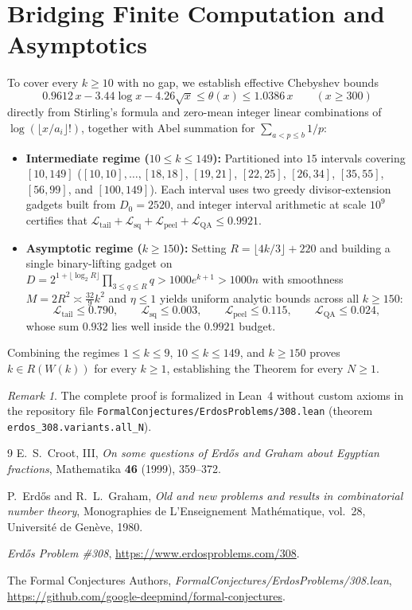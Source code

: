 \documentclass[11pt,a4paper]{amsart}
\theoremstyle{remark}
\newtheorem*{remark}{Remark}
\begin{document}
\section{Bridging Finite Computation and Asymptotics}

To cover every $k \ge 10$ with no gap, we establish effective Chebyshev bounds
\[
0.9612\, x - 3.44 \log x - 4.26 \sqrt{x} \le \theta(x) \le 1.0386\, x \qquad (x \ge 300)
\]
directly from Stirling's formula and zero-mean integer linear combinations of $\log(\lfloor x / a_i \rfloor!)$, together with Abel summation for $\sum_{a < p \le b} 1/p$:
\begin{itemize}
\item \textbf{Intermediate regime ($10 \le k \le 149$):} Partitioned into $15$ intervals covering $[10, 149]$ ($[10, 10], \dots, [18, 18]$, $[19, 21]$, $[22, 25]$, $[26, 34]$, $[35, 55]$, $[56, 99]$, and $[100, 149]$). Each interval uses two greedy divisor-extension gadgets built from $D_0 = 2520$, and integer interval arithmetic at scale $10^9$ certifies that $\mathcal{L}_{\mathrm{tail}} + \mathcal{L}_{\mathrm{sq}} + \mathcal{L}_{\mathrm{peel}} + \mathcal{L}_{\mathrm{QA}} \le 0.9921$.
\item \textbf{Asymptotic regime ($k \ge 150$):} Setting $R = \lfloor 4 k / 3 \rfloor + 220$ and building a single binary-lifting gadget on $D = 2^{1 + \lfloor \log_2 R \rfloor} \prod_{3 \le q \le R} q > 1000 e^{k+1} > 1000 n$ with smoothness $M = 2 R^2 \asymp \frac{32}{9} k^2$ and $\eta \le 1$ yields uniform analytic bounds across all $k \ge 150$:
\[
\mathcal{L}_{\mathrm{tail}} \le 0.790, \qquad
\mathcal{L}_{\mathrm{sq}} \le 0.003, \qquad
\mathcal{L}_{\mathrm{peel}} \le 0.115, \qquad
\mathcal{L}_{\mathrm{QA}} \le 0.024,
\]
whose sum $0.932$ lies well inside the $0.9921$ budget.
\end{itemize}

Combining the regimes $1 \le k \le 9$, $10 \le k \le 149$, and $k \ge 150$ proves $k \in R(W(k))$ for every $k \ge 1$, establishing the Theorem for every $N \ge 1$.

\begin{remark}
The complete proof is formalized in Lean~4 without custom axioms in the repository file \texttt{FormalConjectures/ErdosProblems/308.lean} (theorem \texttt{erdos\_308.variants.all\_N}).
\end{remark}

\begin{thebibliography}{9}
E.~S.~Croot, III, \emph{On some questions of Erd\H{o}s and Graham about Egyptian fractions}, Mathematika \textbf{46} (1999), 359--372.

P.~Erd\H{o}s and R.~L.~Graham, \emph{Old and new problems and results in combinatorial number theory}, Monographies de L'Enseignement Math\'ematique, vol.~28, Universit\'e de Gen\`eve, 1980.

\emph{Erd\H{o}s Problem \#308}, \url{https://www.erdosproblems.com/308}.

The Formal Conjectures Authors, \emph{FormalConjectures/ErdosProblems/308.lean},\\ \url{https://github.com/google-deepmind/formal-conjectures}.
\end{thebibliography}
\end{document}
